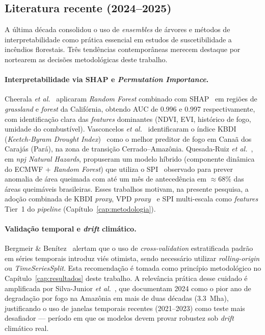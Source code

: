 \subsection{Literatura recente (2024--2025)}

A última década consolidou o uso de \emph{ensembles} de árvores e métodos de interpretabilidade como prática essencial em estudos de suscetibilidade a incêndios florestais. Três tendências contemporâneas merecem destaque por nortearem as decisões metodológicas deste trabalho.

\paragraph{Interpretabilidade via SHAP e \emph{Permutation Importance}.} Cheerala \emph{et al.}~\cite{cheerala2025probabilistic} aplicaram \emph{Random Forest} combinado com SHAP~\cite{lundberg2017unified} em regiões de \emph{grassland} e \emph{forest} da Califórnia, obtendo AUC de \num{0,996} e \num{0,997} respectivamente, com identificação clara das \emph{features} dominantes (NDVI, EVI, histórico de fogo, umidade do combustível). Vasconcelos \emph{et al.}~\cite{forests2024cerradoamazon} identificaram o índice KBDI (\emph{Keetch-Byram Drought Index})~\cite{keetch1968drought} como o melhor preditor de fogo em Canaã dos Carajás (Pará), na zona de transição Cerrado--Amazônia. Quesada-Ruiz \emph{et al.}~\cite{npjhazards2025fire}, em \emph{npj Natural Hazards}, propuseram um modelo híbrido (componente dinâmica do ECMWF + \emph{Random Forest}) que utiliza o SPI~\cite{mckee1993spi} observado para prever anomalia de área queimada com até um mês de antecedência em \(\approx 68\%\) das áreas queimáveis brasileiras. Esses trabalhos motivam, na presente pesquisa, a adoção combinada de KBDI \emph{proxy}, VPD \emph{proxy}~\cite{seager2015climatology} e SPI multi-escala como \emph{features} Tier~1 do \emph{pipeline} (Capítulo~\ref{cap:metodologia}).

\paragraph{Validação temporal e \emph{drift} climático.} Bergmeir \& Benítez~\cite{bergmeir2012cv} alertam que o uso de \emph{cross-validation} estratificada padrão em séries temporais introduz viés otimista, sendo necessário utilizar \emph{rolling-origin} ou \emph{TimeSeriesSplit}. Esta recomendação é tomada como princípio metodológico no Capítulo~\ref{cap:resultados} deste trabalho. A relevância prática desse cuidado é amplificada por Silva-Junior \emph{et al.}~\cite{silvajunior2025amazon}, que documentam 2024 como o pior ano de degradação por fogo na Amazônia em mais de duas décadas (\SI{3,3}{\mega\hectare}), justificando o uso de janelas temporais recentes (2021--2023) como teste mais desafiador --- período em que os modelos devem provar robustez sob \emph{drift} climático real.

